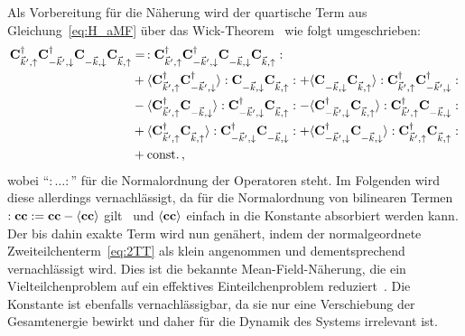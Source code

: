 Als Vorbereitung für die Näherung wird der quartische Term aus Gleichung~\eqref{eq:H_aMF} über das Wick-Theorem~\cite{wick_evaluation_1950,kehrein_flow_2006} wie folgt umgeschrieben:
\begin{align}
    \ocdu \ocdd \ocndd \ocndu &= \, :\ocdu \ocdd \ocndd \ocndu:\label{eq:2TT}\\
    &+ \expval{\ocdu \ocdd} :\ocndd \ocndu: + \expval{\ocndd \ocndu} :\ocdu \ocdd:\label{eq:anomal}\\
    &- \expval{\ocdu \ocndd} :\ocdd \ocndu: - \expval{\ocdd \ocndu} :\ocdu \ocndd:\label{eq:fock}\\
    &+ \expval{\ocdu \ocndu} :\ocdd \ocndd: + \expval{\ocdd \ocndd} :\ocdu \ocndu:\label{eq:hartree}\\
    &+ \text{const.} \, ,
\end{align}
wobei ``$: \dots :$'' für die Normalordnung der Operatoren steht.
Im Folgenden wird diese allerdings vernachlässigt, da für die Normalordnung von bilinearen Termen $: \mathbf{c}\mathbf{c}: = \mathbf{c}\mathbf{c} - \langle\mathbf{c} \mathbf{c}\rangle $ gilt~\cite{kehrein_flow_2006} und $\langle\mathbf{c} \mathbf{c}\rangle$ einfach in die Konstante absorbiert werden kann.
Der bis dahin exakte Term wird nun genähert, indem der normalgeordnete Zweiteilchenterm~\eqref{eq:2TT} als klein angenommen und dementsprechend vernachlässigt wird. 
Dies ist die bekannte Mean-Field-Näherung, die ein Vielteilchenproblem auf ein effektives Einteilchenproblem reduziert~\cite[66]{bruus_manybody_2004}.
Die Konstante ist ebenfalls vernachlässigbar, da sie nur eine Verschiebung der Gesamtenergie bewirkt und daher für die Dynamik des Systems irrelevant ist. \\

